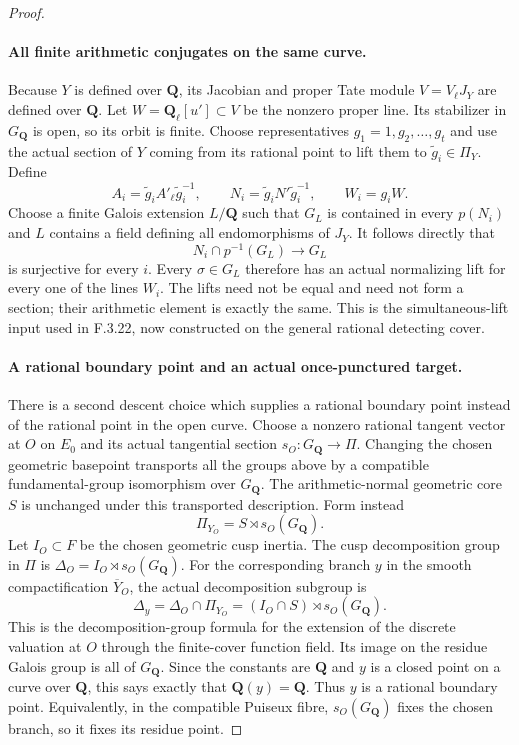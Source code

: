 \begin{proof}
\paragraph{All finite arithmetic conjugates on the same curve.}
Because $Y$ is defined over $\mathbf Q$, its Jacobian and
proper Tate module $V=V_\ell J_Y$ are defined over
$\mathbf Q$. Let $W=\mathbf Q_\ell[u']\subset V$ be the
nonzero proper line. Its stabilizer in $G_{\mathbf Q}$ is
open, so its orbit is finite. Choose representatives
$g_1=1,g_2,\ldots,g_t$ and use the actual section of $Y$
coming from its rational point to lift them to
$\widetilde g_i\in\Pi_Y$. Define
\[
 A_i=\widetilde g_i A'_\ell\widetilde g_i^{-1},\qquad
 N_i=\widetilde g_i N'\widetilde g_i^{-1},\qquad
 W_i=g_iW.
\]
Choose a finite Galois extension $L/\mathbf Q$ such that
$G_L$ is contained in every $p(N_i)$ and $L$ contains a
field defining all endomorphisms of $J_Y$.
It follows directly that
\[
 N_i\cap p^{-1}(G_L)\longrightarrow G_L
\]
is surjective for every $i$. Every $\sigma\in G_L$ therefore
has an actual normalizing lift for every one of the lines
$W_i$. The lifts need not be equal and need not form a
section; their arithmetic element is exactly the same.
This is the simultaneous-lift input used in F.3.22, now
constructed on the general rational detecting cover.

\paragraph{A rational boundary point and an actual once-punctured target.}
There is a second descent choice which supplies a rational
boundary point instead of the rational point in the open
curve. Choose a nonzero rational tangent vector at $O$ on
$E_0$ and its actual tangential section
$s_O:G_{\mathbf Q}\to\Pi$. Changing the chosen geometric
basepoint transports all the groups above by a compatible
fundamental-group isomorphism over $G_{\mathbf Q}$.
The arithmetic-normal geometric core $S$ is unchanged
under this transported description. Form instead
\[
          \Pi_{Y_O}=S\rtimes s_O(G_{\mathbf Q}).
\]
Let $I_O\subset F$ be the chosen geometric cusp inertia.
The cusp decomposition group in $\Pi$ is
$\Delta_O=I_O\rtimes s_O(G_{\mathbf Q})$. For the
corresponding branch $y$ in the smooth compactification
$\overline Y_O$, the actual decomposition subgroup is
\[
 \Delta_y=\Delta_O\cap\Pi_{Y_O}
          =(I_O\cap S)\rtimes s_O(G_{\mathbf Q}).
\]
This is the decomposition-group formula for the extension
of the discrete valuation at $O$ through the finite-cover
function field. Its image on the residue Galois group is
all of $G_{\mathbf Q}$. Since the constants are $\mathbf Q$
and $y$ is a closed point on a curve over $\mathbf Q$,
this says exactly that $\mathbf Q(y)=\mathbf Q$.
Thus $y$ is a rational boundary point. Equivalently, in
the compatible Puiseux fibre, $s_O(G_{\mathbf Q})$ fixes
the chosen branch, so it fixes its residue point.


\end{proof}
